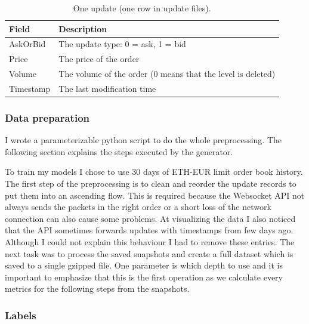 \documentclass[11pt,a4paper,oneside]{article}
\begin{document}
\begin{table}[tbh]
  \centering
  \begin{tabular}{|l|l|}
    \hline
    Field       & Description \\
    \hline
    AskOrBid    & The update type: 0 = ask, 1 = bid \\
    \hline
    Price       & The price of the order \\
    \hline
    Volume      & The volume of the order (0 means that the level is deleted)\\
    \hline
    Timestamp   & The last modification time \\
    \hline
  \end{tabular}
  \caption{One update (one row in update files).}
  \label{table:2}
\end{table}

  \subsubsection{Data preparation}
  \label{dataprep}

  I wrote a parameterizable python script to do the whole preprocessing. The following section explains the steps 
  executed by the generator.

  To train my models I chose to use 30 days of ETH-EUR limit order book history. The first step of the preprocessing is 
  to clean and reorder the update records to put them into an ascending flow. This is required because the Websocket API 
  not always sends the packets in the right order or a short loss of the network connection can also cause some 
  problems. At visualizing the data I also noticed that the API sometimes forwards updates with timestamps from few days 
  ago. Although I could not explain this behaviour I had to remove these entries. The next task was to process the 
  saved snapshots and create a full dataset which is saved to a single gzipped file. One parameter is which depth to 
  use and it is important to emphasize that this is the first operation as we calculate every metrics for the following 
  steps from the snapshots.

  \subsubsection{Labels}
  \label{labels}
\end{document}
